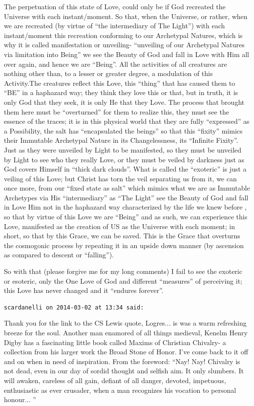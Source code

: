 \begin{footnotesize}
\begin{sffamily}
The perpetuation of this state of Love, could only be if God recreated the Universe with each instant/moment. So that, when the Universe, or rather, when we are recreated (by virtue of ``the intermediary of The Light'') with each instant/moment this recreation conforming to our Archetypal Natures, which is why it is called manifestation or unveiling- ``unveiling of our Archetypal Natures via limitation into Being'' we see the Beauty of God and fall in Love with Him all over again, and hence we are ``Being''. All the activities of all creatures are nothing other than, to a lesser or greater degree, a modulation of this Activity.The creatures reflect this Love, this ``thing'' that has caused them to ``BE'' in a haphazard way; they think they love this or that, but in truth, it is only God that they seek, it is only He that they Love. The process that brought them here must be ``overturned'' for them to realize this, they must see the essence of the traces; it is in this physical world that they are fully ``expressed'' as a Possibility, the salt has ``encapsulated the beings'' so that this ``fixity'' mimics their Immutable Archetypal Nature in its Changelessness, its ``Infinite Fixity''. Just as they were unveiled by Light to be manifested, so they must be unveiled by Light to see who they really Love, or they must be veiled by darkness just as God covers Himself in ``thick dark clouds''. What is called the ``exoteric'' is just a veiling of this Love; but Christ has torn the veil separating us from it, we can once more, from our ``fixed state as salt'' which mimics what we are as Immutable Archetypes via His ``intermediary'' as ``The Light'' see the Beauty of God and fall in Love Him not in the haphazard way characterized by the life we knew before , so that by virtue of this Love we are ``Being'' and as such, we can experience this Love, manifested as the creation of US as the Universe with each moment; in short, so that by this Grace, we can be saved. This is the Grace that overturns the cosmogonic process by repeating it in an upside down manner (by ascension as compared to descent or ``falling'').

So with that (please forgive me for my long comments) I fail to see the exoteric or esoteric, only the One Love of God and different ``measures'' of perceiving it; this Love has never changed and it ``endures forever''.

\hfill

\texttt{scardanelli on 2014-03-02 at 13:34 said:}

Thank you for the link to the CS Lewis quote, Logres... is was a warm refreshing breeze for the soul. Another man enamored of all things medieval, Kenelm Henry Digby has a fascinating little book called Maxims of Christian Chivalry- a collection from his larger work the Broad Stone of Honor. I've come back to it off and on when in need of inspiration. From the foreword: ``Nay! Nay! Chivalry is not dead, even in our day of sordid thought and selfish aim. It only slumbers. It will awaken, careless of all gain, defiant of all danger, devoted, impetuous, enthusiastic as ever crusader, when a man recognizes his vocation to personal honour... ''


\end{sffamily}
\end{footnotesize}
